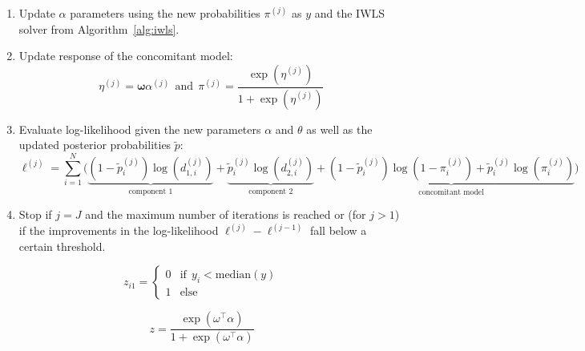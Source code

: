\documentclass[article,nojss,shortnames]{jss}
\begin{document}
\begin{algorithm}
\begin{enumerate}
        \item Update $\mathit{\alpha}$ parameters using the new probabilities $\pi^{(j)}$
            as $\mathit{y}$ and the IWLS solver from Algorithm~\ref{alg:iwls}.

        \item Update response of the concomitant model:
            \begin{equation*}
                \mathit{\eta}^{(j)} = \mathbf{\omega}\mathit{\alpha}^{(j)}
                ~~\text{and}~~
                \mathit{\pi}^{(j)} = \frac{\exp(\mathit{\eta}^{(j)})}{1 + \exp(\mathit{\eta}^{(j)})}
            \end{equation*}

        \item Evaluate log-likelihood given the new parameters $\mathit{\alpha}$ and $\mathit{\theta}$
            as well as the updated posterior probabilities $\mathit{\tilde{p}}$:
            \begin{equation*}
                \ell^{(j)} = \sum_{i=1}^N \Big(
                \underbrace{
                    (1 - \tilde{p}_i^{(j)}) \log(d_{1,i}^{(j)})
                }_{\text{component 1}}
                +
                \underbrace{
                    \tilde{p}_i^{(j)} \log(d_{2,i}^{(j)})
                }_{\text{component 2}}
                +
                \underbrace{
                    (1 - \tilde{p}_i^{(j)}) \log(1 - \pi_i^{(j)}) + \tilde{p}_i^{(j)} \log(\pi_i^{(j)})
                }_{\text{concomitant model}}
                \Big)
            \end{equation*}

        \item Stop if $j = J$ and the maximum number of iterations is reached or
            (for $j > 1$) if the improvements in the log-likelihood $\ell^{(j)} - \ell^{(j-1)}$
            fall below a certain threshold.
    \end{enumerate}
\end{algorithm}


\begin{equation}
    z_{i1} = \begin{cases} 0 & \text{if} ~~ y_i < \text{median}(y) \\ 1 & \text{else}\end{cases}
\end{equation}


\begin{equation}
    z = \frac{\exp(\omega^\top \alpha)}{1 + \exp(\omega^\top \alpha)}
\end{equation}
\end{document}
